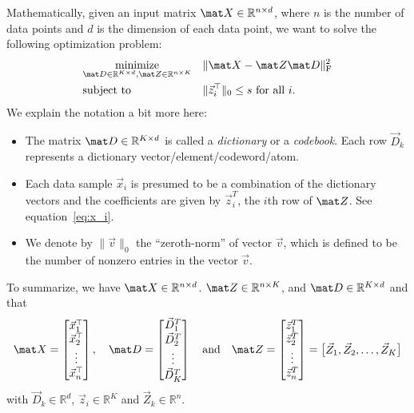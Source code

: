 \documentclass[preview]{standalone}
\begin{document}
Mathematically, given an input matrix $\mat X\in\mathbb R^{n\times d}$,
where $n$ is the number of data points and $d$ is the dimension of
each data point, we want to solve the following optimization problem:
\begin{equation}
\label{eq:obj}
\begin{aligned}
& \underset{\mat D\in\mathbb R^{K\times d}, \mat  Z\in\mathbb R^{n\times K}}{\text{minimize}}
& & \|\mat X-\mat Z \mat D\|_{\text{F}}^2\\
& \text{subject to}
& & \|\vec z_i^\top \|_0\leq s \text{ for all $i$}.
\end{aligned}
\end{equation}
We explain the notation a bit more here:
\begin{itemize}
	\item The matrix $\mat D \in \mathbb R^{K\times d}$ is called a \textit{dictionary}
or a \emph{codebook}. Each row $\vec D_k$ represents a dictionary vector/element/codeword/atom.
	\item Each data sample $\vec x_i$ is presumed to be a combination of the dictionary vectors and
	the coefficients are given by  $\vec z_i^T$, the $i$th row of $\mat Z$. See equation~\eqref{eq:x_i}.
	\item We denote by $\|\vec v\|_0$ the ``zeroth-norm'' of vector $\vec v$, which is defined to be the number of nonzero entries in the vector $\vec v$.
\end{itemize}
To summarize, we have $\mat X \in \mathbb{R}^{n \times d}$. 
$\mat Z \in \mathbb{R}^{n \times K}$, and $\mat D \in \mathbb{R}^{K \times d}$
and that
\begin{equation*}
	\mat X = \begin{bmatrix}
		\vec x_1^\top \\
		\vec x_2^\top \\
		\vdots \\
		\vec x_n^\top
	\end{bmatrix}, \quad
	\mat  D = \begin{bmatrix}
		\vec D_1^T\\
		\vec D_2^T\\
		\vdots\\
		\vec D_K^T
	\end{bmatrix} \quad \text{and} \quad
	\mat Z = \begin{bmatrix}
		\vec z_1^T\\
		\vec z_2^T\\
		\vdots\\
		\vec z_n^T
	\end{bmatrix}
	=\begin{bmatrix}
		\vec Z_1, \vec Z_2, \ldots, \vec Z_K
	\end{bmatrix}
\end{equation*}
with $ \vec D_k\in\mathbb R^d$, $\vec z_i\in\mathbb R^K$ and $\vec Z_k\in\mathbb R^n$.
\end{document}
